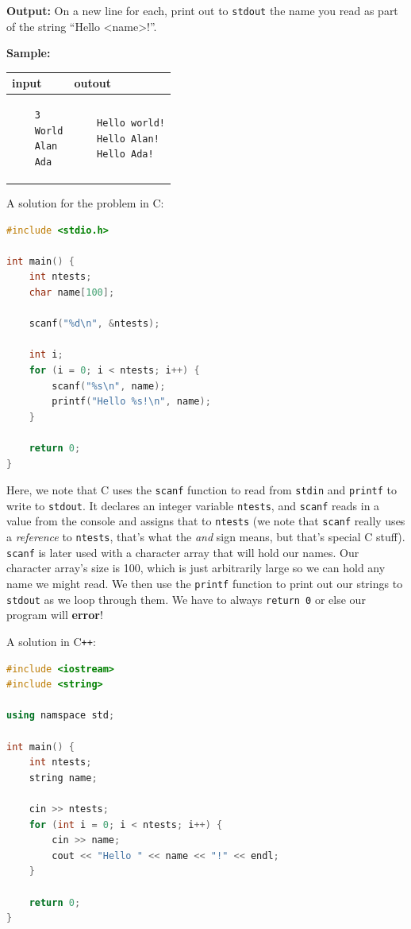 \documentclass[a4paper]{article}
\begin{document}
\textbf{Output:} On a new line for each, print out to \texttt{stdout} the name you read as part of the string ``Hello \textless name\textgreater!''.

\textbf{Sample:}

\begin{tabular}{|p{}|p{}|}
    \hline
    \textbf{input} & \textbf{outout} \\
    \hline
    \begin{verbatim}
    3
    World
    Alan
    Ada
    \end{verbatim} &
    \begin{verbatim}
    Hello world!
    Hello Alan!
    Hello Ada!
    \end{verbatim} \\
    \hline
\end{tabular}
\newpage

A solution for the problem in C:
\begin{lstlisting}[language=C]
#include <stdio.h>

int main() {
    int ntests;
    char name[100];

    scanf("%d\n", &ntests);

    int i;
    for (i = 0; i < ntests; i++) {
        scanf("%s\n", name);
        printf("Hello %s!\n", name);
    }

    return 0;
}
\end{lstlisting}

Here, we note that C uses the \texttt{scanf} function to read from \texttt{stdin} and \texttt{printf} to write to \texttt{stdout}. It declares an integer variable \texttt{ntests}, and \texttt{scanf} reads in a value from the console and assigns that to \texttt{ntests} (we note that \texttt{scanf} really uses a \textit{reference} to \texttt{ntests}, that's what the \textit{and} sign means, but that's special C stuff). \texttt{scanf} is later used with a character array that will hold our names. Our character array's size is 100, which is just arbitrarily large so we can hold any name we might read. We then use the \texttt{printf} function to print out our strings to \texttt{stdout} as we loop through them. We have to always \texttt{return 0} or else our program will \textbf{error}! 

A solution in C\texttt{++}:
\begin{lstlisting}[language=C++]
#include <iostream>
#include <string>

using namspace std;

int main() {
    int ntests;
    string name;

    cin >> ntests;
    for (int i = 0; i < ntests; i++) {
        cin >> name;
        cout << "Hello " << name << "!" << endl;
    }

    return 0;
}
\end{lstlisting}
\end{document}
